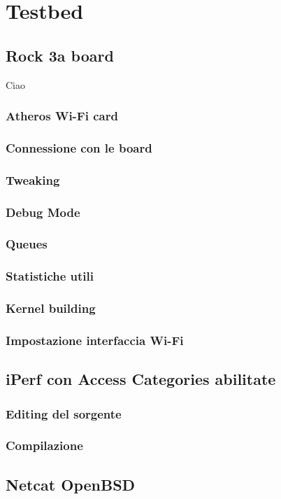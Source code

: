 \chapter{Testbed}

\section{Rock 3a board}
Ciao \cite{shen2013distributed}
\lipsum[1-30]

\subsection[Atheros Wi-Fi card]{Atheros Wi-Fi card}

\subsection[Connessione con le board]{Connessione con le board}

\subsection[Tweaking]{Tweaking}

\subsection[Debug Mode]{Debug Mode}

\subsection[Queues]{Queues}

\subsection[Statistiche utili]{Statistiche utili}

\subsection[Kernel building]{Kernel building}

\subsection[Impostazione interfaccia Wi-Fi]{Impostazione interfaccia Wi-Fi}

\section{iPerf con Access Categories abilitate}

\subsection[Editing del sorgente]{Editing del sorgente}

\subsection[Compilazione]{Compilazione}

\section{Netcat OpenBSD}